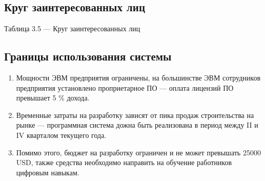 \subsection{Круг заинтересованных лиц}

Таблица 3.5 --- Круг заинтересованных лиц
\begin{table}[h!]
\end{table}

\subsection{Границы использования системы}

\begin{enumerate}
	\item{Мощности ЭВМ предприятия ограничены, на большинстве ЭВМ сотрудников предприятия установлено проприетарное ПО --- оплата лицензий ПО превышает 5 \% дохода.}

	\item{Временные затраты на разработку зависят от пика продаж строительства на рынке --- программная система дожна быть реализована в период между II и IV кварталом текущего года.}

	\item{Помимо этого, бюджет на разработку ограничен и не может превышать 25000 USD, также средства необходимо направить на обучение работников цифровым навыкам.} 

\end{enumerate}
